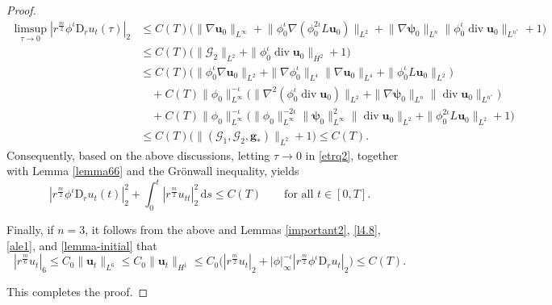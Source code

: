 \documentclass[11pt,reqno]{amsart}
\DeclareMathOperator{\diver}{\mathrm{div}}
\numberwithin{rk}{section}
\numberwithin{prop}{section}
\numberwithin{mydef}{section}
\numberwithin{lem}{section}
\numberwithin{equation}{section}
\numberwithin{thm}{section}
\begin{document}
\begin{proof}
\begin{equation*}
\begin{aligned}
\limsup_{\tau\to 0} |r^{\frac{m}{2}}\phi^\iota\mathrm{D}_ru_t(\tau)|_2&\leq C(T) \big(\|\nabla\boldsymbol{u}_0\|_{L^\infty}\!+\! \|\phi_0^\iota\nabla(\phi_0^{2\iota}L\boldsymbol{u}_0)\|_{L^2}\! +\! \|\nabla\boldsymbol{\psi}_0\|_{L^n} \|\phi_0^{\iota}\diver\boldsymbol{u}_0\|_{L^{n^*}}\!+1\big)\\[-4pt]
&\leq C(T)\big(\|\mathcal{G}_2\|_{L^2}+   \|\phi_0^{\iota}\diver\boldsymbol{u}_0\|_{H^2}+1\big)\\[1pt]
&\leq C(T)\big(\|\phi_0^{\iota}\nabla\boldsymbol{u}_0\|_{L^2}+\|\nabla\phi_0^{\iota}\|_{L^4}\|\nabla\boldsymbol{u}_0\|_{L^4}+\|\phi_0^{\iota}L\boldsymbol{u}_0\|_{L^2}\big)\\
&\quad +C(T)\|\phi_0\|_{L^\infty}^{-\iota}\big(\|\nabla^2(\phi_0^{\iota}\diver\boldsymbol{u}_0)\|_{L^2}+\|\nabla\boldsymbol{\psi}_0\|_{L^n}\|\diver\boldsymbol{u}_0 \|_{L^{n^*}}\big)\\
&\quad +C(T)\|\phi_0\|_{L^\infty}^{-\iota}\big(\|\phi_0\|_{L^\infty}^{-2\iota}\|\boldsymbol{\psi}_0\|_{L^\infty}^2\|\diver\boldsymbol{u}_0 \|_{L^{2}}+\|\phi_0^{2\iota}L\boldsymbol{u}_0\|_{L^2}+1\big)\\[1pt]
&\leq C(T)\big(\|(\mathcal{G}_1,\mathcal{G}_2,\boldsymbol{g}_*)\|_{L^2}+1\big)\leq C(T).
\end{aligned}
\end{equation*}
Consequently, based on the above discussions, letting $\tau\to 0$ in \eqref{etrq2}, together with Lemma \ref{lemma66} and the Gr\"onwall inequality, yields 
\begin{equation*}
|r^{\frac{m}{2}}\phi^\iota\mathrm{D}_r u_t(t)|^2_2+\int_{0}^{t}  |r^{\frac{m}{2}}u_{tt}|^2_2 \,\mathrm{d}s\leq C(T)\qquad\text{for all $t\in [0,T]$}.
\end{equation*}

Finally, if $n=3$, it follows from the above and Lemmas \ref{important2}, \ref{l4.8}, \ref{ale1}, and \ref{lemma-initial} that
\begin{equation*}
|r^\frac{m}{6} u_t|_{6}\leq C_0\|\boldsymbol{u}_t\|_{L^{6}}\leq C_0\|\boldsymbol{u}_t\|_{H^1}\leq C_0\big(|r^\frac{m}{2} u_t |_{2}+|\phi|_\infty^{-\iota}|r^\frac{m}{2}\phi^\iota\mathrm{D}_r u_t |_{2}\big)\leq C(T).
\end{equation*}

This completes the proof.
\end{proof}
\end{document}
